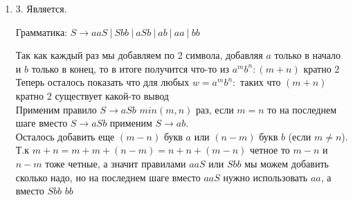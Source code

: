 \documentclass[12pt]{article}
\newenvironment{MyList}[1][4pt]{
  \begin{enumerate}[1.]
  \setlength{\parskip}{0pt}
  \setlength{\itemsep}{#1}
}{       
  \end{enumerate}
}
\begin{document}
\begin{MyList}
	\item[3.] Является.
	
	Грамматика: $S \to aaS\ |\ Sbb\ |\ aSb\ |\ ab\ |\ aa\ |\ bb$
	
	Так как каждый раз мы добавляем по 2 символа, добавляя $a$ только в начало и $b$ только в конец, то в итоге получится что-то из $a^mb^n: (m + n)$ кратно 2\\
	Теперь осталось показать что для любых $w = a^mb^n:$ таких что $(m + n)$ кратно 2 существует какой-то вывод\\
	Применим правило $S \to aSb$ $min(m,n)$ раз, если $m = n$ то на последнем шаге вместо  $S \to aSb$ применим $S \to ab$.\\ 
	Осталось добавить еще $(m - n)$ букв $a$ или $(n - m)$ букв $b$ (если $m \ne n$).\\
	Т.к $m + n = m + m + (n - m) = n + n + (m - n)$ четное то $m - n$ и $n - m$ тоже четные, а значит правилами $aaS$ или $Sbb$ мы можем добавить сколько надо, но на последнем шаге вместо $aaS$ нужно использовать $aa$, а вместо $Sbb$ $bb$\\
\end{MyList}
\end{document}
